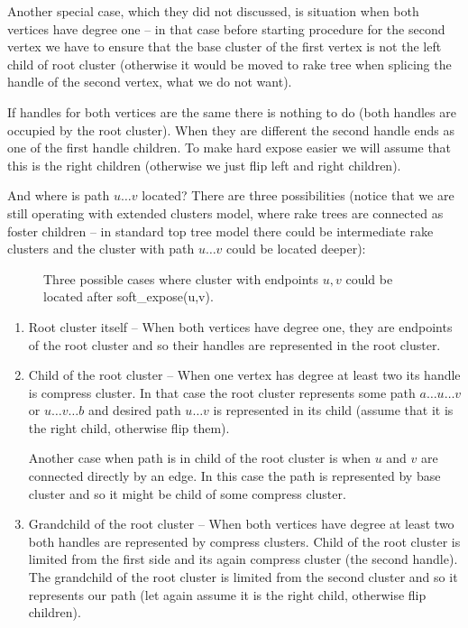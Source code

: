 Another special case, which they did not discussed, is situation when both
vertices have degree one -- in that case before starting procedure for the
second vertex we have to ensure that the base cluster of the first vertex is not
the left child of root cluster (otherwise it would be moved to rake tree when
splicing the handle of the second vertex, what we do not want).

If handles for both vertices are the same there is nothing to do (both handles
are occupied by the root cluster). When they are different the second handle
ends as one of the first handle children. To make hard expose easier we will
assume that this is the right children (otherwise we just flip left and right
children).

And where is path $u\dots v$ located? There are three possibilities (notice that
we are still operating with extended clusters model, where rake trees are
connected as foster children -- in standard top tree model there could be
intermediate rake clusters and the cluster with path $u\dots v$ could be located
deeper):

\begin{figure}[h]
\centering
{}
\caption{Three possible cases where cluster with endpoints $u,v$ could be located
after {\I soft\_expose(u,v)}.}
\end{figure}

\begin{enumerate}

\item Root cluster itself -- When both vertices have degree one, they are endpoints
of the root cluster and so their handles are represented in the root cluster.

\item Child of the root cluster -- When one vertex has degree at least two its
handle is compress cluster. In that case the root cluster represents some path
$a\dots u\dots v$ or $u\dots v\dots b$ and desired path $u\dots v$ is
represented in its child (assume that it is the right child, otherwise flip them).

Another case when path is in child of the root cluster is when $u$ and $v$ are
connected directly by an edge. In this case the path is represented by base cluster
and so it might be child of some compress cluster.

\item Grandchild of the root cluster -- When both vertices have degree at least
two both handles are represented by compress clusters. Child of the root cluster
is limited from the first side and its again compress cluster (the second handle).
The grandchild of the root cluster is limited from the second cluster and so it
represents our path (let again assume it is the right child, otherwise flip
children).

\end{enumerate}

